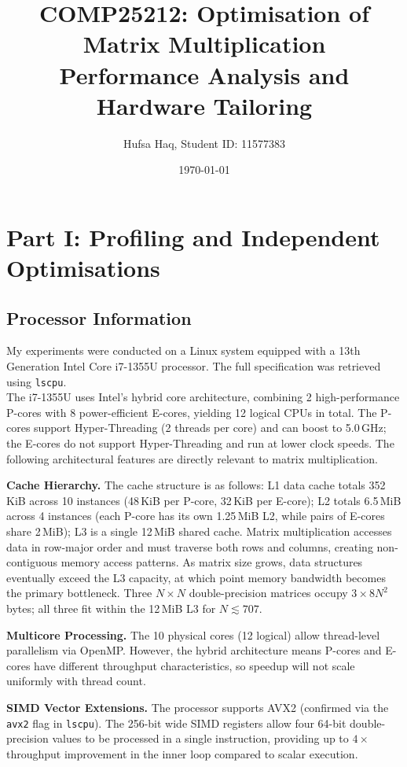 \documentclass[11pt, a4paper]{article}
\title{COMP25212: Optimisation of Matrix Multiplication \\ \large Performance Analysis and Hardware Tailoring}
\author{Hufsa Haq, Student ID: 11577383}
\date{\today}
\begin{document}
\maketitle

\section{Part I: Profiling and Independent Optimisations}

\subsection{Processor Information}

My experiments were conducted on a Linux system equipped with a 13th Generation Intel Core i7-1355U processor. The full specification was retrieved using \texttt{lscpu}.
\\

The i7-1355U uses Intel's hybrid core architecture, combining 2 high-performance P-cores with 8 power-efficient E-cores, yielding 12 logical CPUs in total. The P-cores support Hyper-Threading (2 threads per core) and can boost to 5.0\,GHz; the E-cores do not support Hyper-Threading and run at lower clock speeds. The following architectural features are directly relevant to matrix multiplication.

\textbf{Cache Hierarchy.}
The cache structure is as follows: L1 data cache totals 352\,KiB across 10 instances (48\,KiB per P-core, 32\,KiB per E-core); L2 totals 6.5\,MiB across 4 instances (each P-core has its own 1.25\,MiB L2, while pairs of E-cores share 2\,MiB); L3 is a single 12\,MiB shared cache. Matrix multiplication accesses data in row-major order and must traverse both rows and columns, creating non-contiguous memory access patterns. As matrix size grows, data structures eventually exceed the L3 capacity, at which point memory bandwidth becomes the primary bottleneck. Three $N \times N$ double-precision matrices occupy $3 \times 8N^2$ bytes; all three fit within the 12\,MiB L3 for $N \lesssim 707$.

\textbf{Multicore Processing.}
The 10 physical cores (12 logical) allow thread-level parallelism via OpenMP. However, the hybrid architecture means P-cores and E-cores have different throughput characteristics, so speedup will not scale uniformly with thread count.

\textbf{SIMD Vector Extensions.}
The processor supports AVX2 (confirmed via the \texttt{avx2} flag in \texttt{lscpu}). The 256-bit wide SIMD registers allow four 64-bit double-precision values to be processed in a single instruction, providing up to $4\times$ throughput improvement in the inner loop compared to scalar execution.
\end{document}
